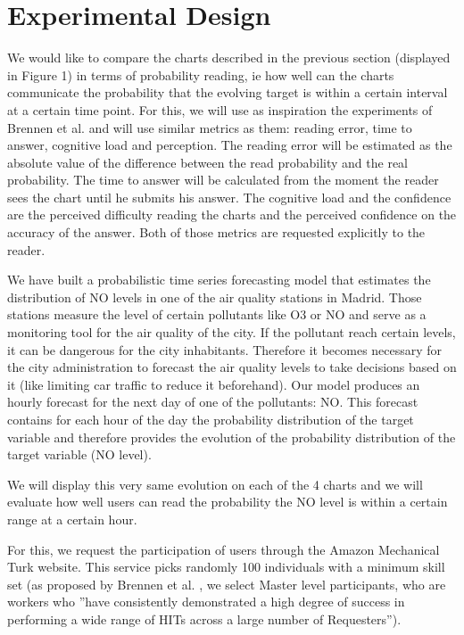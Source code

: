 \documentclass[a4paper,3p,sort&compress]{elsarticle}
\begin{document}
\section{Experimental Design}
\label{sec:exp_design}

We would like to compare the charts described in the previous section (displayed in Figure 1) 
in terms of probability 
reading, ie how well 
can the charts communicate the probability that the evolving target is within a certain interval 
at a certain time point.
 For this, we will use as inspiration the experiments of Brennen et al. \cite{brennen_instrument_2018}
and will use similar metrics 
as them: reading error, time to answer, cognitive load and perception. The reading error will be estimated as the 
absolute value of the difference between the read probability and the real probability. The time to answer 
will be calculated from the moment the reader sees the chart until he submits his answer. The cognitive 
load and the confidence are the perceived difficulty reading the charts and the perceived confidence on 
the accuracy of 
the answer. Both of those metrics are requested explicitly to the reader.

We have built a probabilistic time series forecasting model that estimates the distribution of NO 
levels in one of the air quality stations in Madrid. Those stations measure the level of certain 
pollutants like O3 or NO and serve as a monitoring tool for the air quality of the city. If the pollutant 
reach certain levels, it can be dangerous for the city inhabitants. Therefore it becomes necessary 
for the city administration to 
forecast the air quality levels to take decisions based on it (like limiting car traffic to reduce it beforehand).
Our model produces an hourly forecast for the next day of one of the pollutants: NO. This forecast contains
for each hour of the day the probability distribution of the target variable and therefore provides the evolution 
of the probability distribution of the target variable (NO level).

We will display this very same evolution on each of the 4 charts and we will evaluate how well users can 
read the probability the NO level is within a certain range at a certain hour. 

For this, we request the participation of users through the Amazon Mechanical Turk website. 
This service picks randomly 100 individuals with a minimum skill set (as proposed by Brennen 
et al. \cite{brennen_instrument_2018}, we select Master level participants, who are workers who 
''have consistently demonstrated a high degree of success in performing a wide range of HITs across a 
large number of Requesters'').
\end{document}
